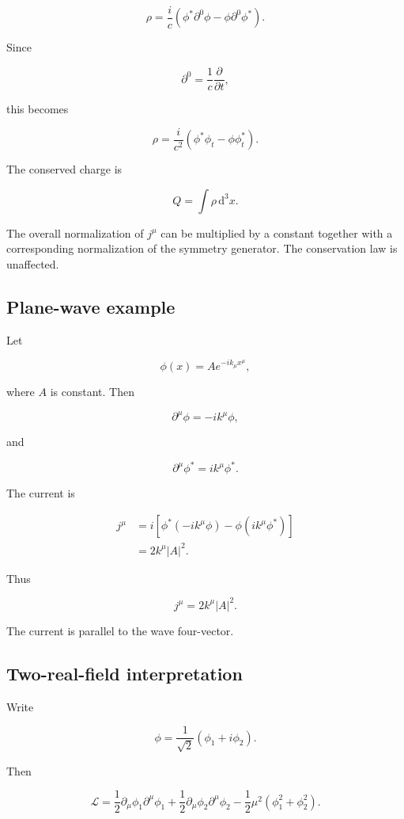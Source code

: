 \[
\boxed{
\rho
=
\frac{i}{c}
\left(
\phi^{*}\partial^{0}\phi
-
\phi\partial^{0}\phi^{*}
\right)
}.
\]

Since

\[
\partial^{0}
=
\frac{1}{c}
\frac{\partial}{\partial t},
\]

this becomes

\[
\boxed{
\rho
=
\frac{i}{c^{2}}
\left(
\phi^{*}\phi_t
-
\phi\phi_t^{*}
\right)
}.
\]

The conserved charge is

\[
\boxed{
Q
=
\int
\rho
\,\mathrm{d}^{3}x
}.
\]

The overall normalization of \(j^{\mu}\) can be multiplied by a constant together with a corresponding normalization of the symmetry generator. The conservation law is unaffected.

\subsection{Plane-wave example}

Let

\[
\phi(x)
=
A
e^{-ik_{\mu}x^{\mu}},
\]

where \(A\) is constant. Then

\[
\partial^{\mu}\phi
=
-ik^{\mu}\phi,
\]

and

\[
\partial^{\mu}\phi^{*}
=
ik^{\mu}\phi^{*}.
\]

The current is

\[
\begin{aligned}
j^{\mu}
&=
i
\left[
\phi^{*}
\left(
-ik^{\mu}\phi
\right)
-
\phi
\left(
ik^{\mu}\phi^{*}
\right)
\right]
\\
&=
2k^{\mu}|A|^{2}.
\end{aligned}
\]

Thus

\[
\boxed{
j^{\mu}
=
2k^{\mu}|A|^{2}
}.
\]

The current is parallel to the wave four-vector.

\subsection{Two-real-field interpretation}

Write

\[
\phi
=
\frac{1}{\sqrt{2}}
\left(
\phi_1+i\phi_2
\right).
\]

Then

\[
\mathcal{L}
=
\frac{1}{2}
\partial_{\mu}\phi_1
\partial^{\mu}\phi_1
+
\frac{1}{2}
\partial_{\mu}\phi_2
\partial^{\mu}\phi_2
-
\frac{1}{2}
\mu^{2}
\left(
\phi_1^{2}+\phi_2^{2}
\right).
\]

